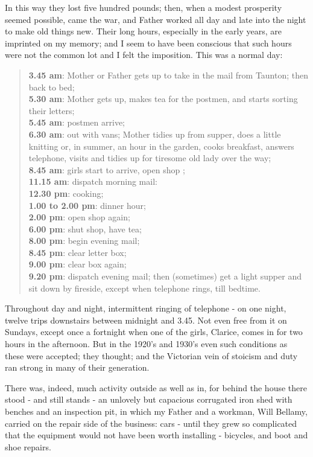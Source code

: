 In this way they lost five hundred pounds; then, when a modest prosperity seemed possible, came the war, and Father worked all day and late into the night to make old things new. Their long hours, especially in the early years, are imprinted on my memory; and I seem to have been conscious that such hours were not the common lot and I felt the imposition. This was a normal day: 

\begin{quote}
\textbf{3.45 am}: Mother or Father gets up to take in the mail from Taunton; then back to bed;
\\ \textbf{5.30 am}: Mother gets up, makes tea for the postmen, and starts sorting their letters; 
\\ \textbf{5.45 am}: postmen arrive;
\\ \textbf{6.30 am}: out with vans; Mother tidies up from supper, does a little knitting or, in summer, an hour in the garden, cooks breakfast, answers telephone, visits and tidies up for tiresome old lady over the way; 
\\ \textbf{8.45 am}: girls start to arrive, open shop ;
\\ \textbf{11.15 am}: dispatch morning mail:
\\ \textbf{12.30 pm}: cooking;
\\ \textbf{1.00 to 2.00 pm}: dinner hour;
\\ \textbf{2.00 pm}: open shop again;
\\ \textbf{6.00 pm}: shut shop, have tea;
\\ \textbf{8.00 pm}: begin evening mail;
\\ \textbf{8.45 pm}: clear letter box;
\\ \textbf{9.00 pm}: clear box again;
\\ \textbf{9.20 pm}:  dispatch evening mail; then (sometimes) get a light supper and sit down by fireside, except when telephone rings, till bedtime. 
\end{quote}

Throughout day and night, intermittent ringing of telephone - on one night, twelve trips downstairs between midnight and 3.45. Not even free from it on Sundays, except once a fortnight when one of the girls, Clarice, comes in for two hours in the afternoon.
But in the 1920's and 1930's even such conditions as these were accepted;  they thought; and the Victorian vein of stoicism and duty ran strong in many of their generation.

There was, indeed, much activity outside as well as in, for behind the house there stood - and still stands - an unlovely but capacious corrugated iron shed with benches and an inspection pit, in which my Father and a workman, Will Bellamy, carried on the repair side of the business: cars - until they grew so complicated that the equipment would not have been worth installing - bicycles, and boot and shoe repairs.

